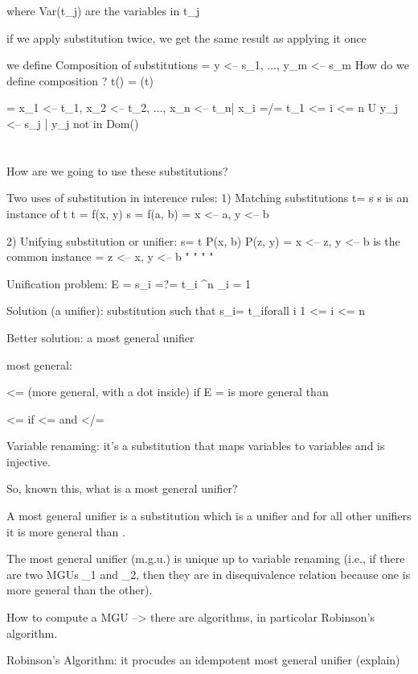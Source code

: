 \documentclass[11pt,a4paper]{article}
\theoremstyle{definition}
\theoremstyle{plain}
\theoremstyle{remark}
\begin{document}
where Var(t_j) are the variables in t_j 

if we apply substitution twice, we get the same result as applying it once 

we define Composition of substitutions \Theta = { y <-- s_1, ..., y_m <-- s_m }
How do we define \sigma composition \Theta?
t(\sigma \dot \Theta) = (t\sigma)\Theta 

\sigma \dot \Theta = { x_1 <-- t_1\Theta, x_2 <-- t_2\Theta, ..., x_n <-- t_n\Theta | x_i =/= t_1 <= i <= n } U { y_j <-- s_j | y_j not in Dom(\sigma) }




\section{}

How are we going to use these substitutions?

Two uses of substitution in interence rules:
1) Matching substitutions    t\sigma = s     s is an instance of t 
t = f(x, y)     s = f(a, b)
\sigma = { x <-- a, y <-- b }

2) Unifying substitution or unifier:     s\sigma = t\sigma
P(x, b)     P(z, y)
\sigma = { x <-- z, y <-- b } is the common instance 
\sigma = { z <-- x, y <-- b } "   "    "     "


Unification problem: E = { s_i =?= t_i }^n _{i = 1}

Solution (a unifier): substitution \sigma such that s_i\sigma = t_i\sigma forall i 1 <= i <= n 

Better solution: a most general unifier 

most general:

\sigma <= (more general, with a dot inside) \Theta if E \rho \sigma \dot \rho = \Theta    \sigma is more general than \Theta

\sigma <= \Theta if \sigma <= \Theta and \Theta </= \sigma



Variable renaming: it's a substitution that maps variables to variables and is injective.



So, known this, what is a most general unifier?

A most general unifier is a substitution \sigma which is a unifier and for all other unifiers \Theta it is \sigma more general than \Theta.

The most general unifier (m.g.u.) is unique up to variable renaming (i.e., if there are two MGUs \sigma_1 and \sigma_2, then they are in disequivalence relation because one is more general than the other).


How to compute a MGU --> there are algorithms, in particolar Robinson's algorithm.

Robinson's Algorithm: it procudes an idempotent most general unifier
(explain)

\fi %
\end{document}
